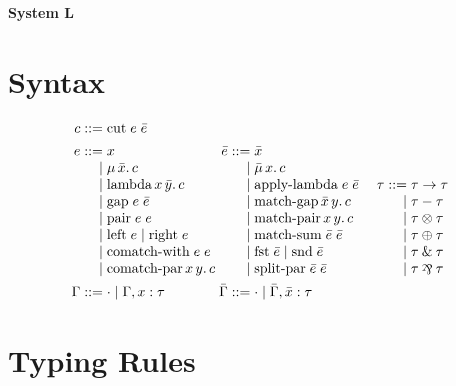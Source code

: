 \documentclass{article}
\def\with{\mathbin{\&}}
\def\parr{\mathbin{\raisebox{-0.25ex}{\rotatebox[origin=c]{180}{\&}}}}
\begin{document}
\noindent
{\huge \textbf{System L}}

\section{Syntax}

\noindent
\[\arraycolsep=1.4pt
\begin{array}{rlrlrl}
  c ::= & \text{cut}\;e\;\bar{e}
  \vspace{1ex}\\
  e ::= & x
  &
  \bar{e}
    ::= & \bar{x}
  \\
  \mid & \mu\,\bar{x}.\,c
  &
  \mid & \bar{\mu}\,x.\,c
  \\
  \mid & \text{lambda}\,x\,\bar{y}.\,c
  &
  \mid & \text{apply-lambda}\;e\;\bar{e}
  &
  \hspace{1em}
  \tau ::= & \tau \to \tau
  \\
  \mid & \text{gap}\;e\;\bar{e}
  &
  \mid & \text{match-gap}\,\bar{x}\,y.\,c
  &
  \mid & \tau - \tau
  \\
  \mid & \text{pair}\;e\;e
  &
  \mid & \text{match-pair}\,x\,y.\,c
  &
  \mid & \tau \otimes \tau
  \\
  \mid & \text{left}\;e \mid \text{right}\;e
  &
  \mid & \text{match-sum}\;\bar{e}\;\bar{e}
  &
  \mid & \tau \oplus \tau
  \\
  \mid & \text{comatch-with}\;e\;e
  &
  \mid & \text{fst}\;\bar{e} \mid \text{snd}\;\bar{e}
  &
  \mid & \tau \with \tau
  \\
  \mid & \text{comatch-par}\,x\,y.\,c
  &
  \mid & \text{split-par}\;\bar{e}\;\bar{e}
  &
  \mid & \tau \parr \tau
  \vspace{1ex}\\
  \Gamma ::= & \cdot
          \mid \Gamma, x : \tau
  &
  \bar{\Gamma}
         ::= & \cdot
          \mid \bar{\Gamma}, \bar{x} : \tau
\end{array}
\]
\vspace{1ex}

\pagebreak

\section{Typing Rules}
\end{document}
